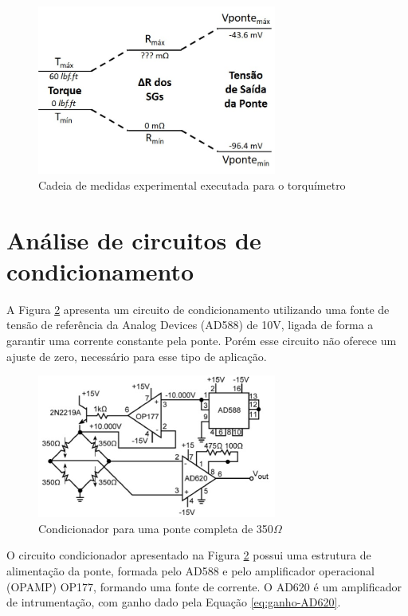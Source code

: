\documentclass[a4paper]{instrumentacao}
\begin{document}
\begin{figure}[H]
\center
\includegraphics[width=0.7\textwidth]{CadeiaMedidasExperimental_Torquimetro.jpg}
\caption{Cadeia de medidas experimental executada para o torquímetro}
\label{fig:torquimetro-cadeia-medidas-experimental}
\end{figure}

\section{Análise de circuitos de condicionamento}

A Figura \ref{fig:condicionador-1} apresenta um circuito de condicionamento utilizando uma fonte de tensão de referência da Analog Devices (AD588) de 10V, ligada de forma a garantir uma corrente constante pela ponte. Porém esse circuito não oferece um ajuste de zero, necessário para esse tipo de aplicação.

\begin{figure}[H]
\center
\includegraphics[width=0.7\textwidth]{condicionador_1.jpg}
\caption{Condicionador para uma ponte completa de 350$\Omega$}
\label{fig:condicionador-1}
\end{figure}

O circuito condicionador apresentado na Figura \ref{fig:condicionador-1} possui uma estrutura de alimentação da ponte, formada pelo AD588 e pelo amplificador operacional (OPAMP) OP177, formando uma fonte de corrente. O AD620 é um amplificador de intrumentação, com ganho dado pela Equação \ref{eq:ganho-AD620}.
\end{document}
